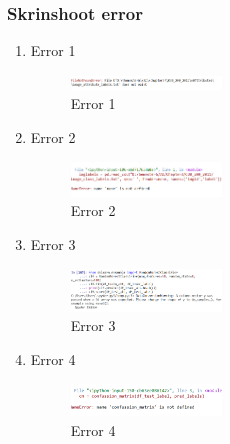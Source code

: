        \subsubsection{Skrinshoot error}
            \begin{enumerate}
                \item Error 1
                \begin{figure}[H]
                    \includegraphics[width=4cm]{figures/1174040/chapter3/err1type.png}
                    \centering
                    \caption{Error 1}
                    \end{figure}
                \item Error 2
                \begin{figure}[H]
                    \includegraphics[width=4cm]{figures/1174040/chapter3/err2type.png}
                    \centering
                    \caption{Error 2}
                    \end{figure}
                \item Error 3
                \begin{figure}[H]
                    \includegraphics[width=4cm]{figures/1174040/chapter3/err3type.png}
                    \centering
                    \caption{Error 3}
                    \end{figure}
                \item Error 4
                \begin{figure}[H]
                    \includegraphics[width=4cm]{figures/1174040/chapter3/err4type.png}
                    \centering
                    \caption{Error 4}
                    \end{figure}
            \end{enumerate}
